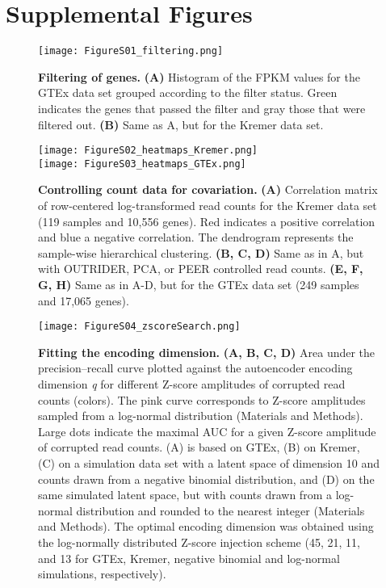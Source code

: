\documentclass[a4paper,12pt]{article}
\begin{document}
\section{Supplemental Figures}


\begin{figure}[h]
    \centering
    \texttt{[image: FigureS01\_filtering.png]}
    \caption{\textbf{Filtering of genes.}
\textbf{(A)} Histogram of the FPKM values for the GTEx data set grouped according to the filter status. Green indicates the genes that passed the filter and gray those that were filtered out. \textbf{(B)} Same as A, but for the Kremer data set.}
\end{figure}
\pagebreak


\begin{figure}[h]
    \centering
    \texttt{[image: FigureS02\_heatmaps\_Kremer.png]}
    \\
    \texttt{[image: FigureS03\_heatmaps\_GTEx.png]}
    \caption{\textbf{Controlling count data for covariation.}
\textbf{(A)} Correlation matrix of row-centered log-transformed read counts for the Kremer data set (119 samples and 10,556 genes). Red indicates a positive correlation and blue a negative correlation. The dendrogram represents the sample-wise hierarchical clustering. \textbf{(B, C, D)} Same as in A, but with OUTRIDER, PCA, or PEER controlled read counts. \textbf{(E, F, G, H)} Same as in A-D, but for the GTEx data set (249 samples and 17,065 genes).}
\end{figure}
\pagebreak


\begin{figure}[h]
    \centering
    \texttt{[image: FigureS04\_zscoreSearch.png]}
    \caption{\textbf{Fitting the encoding dimension.} 
\textbf{(A, B, C, D)} Area under the precision--recall curve plotted against the autoencoder encoding dimension \textit{q} for different Z-score amplitudes of corrupted read counts (colors). The pink curve corresponds to Z-score amplitudes sampled from a log-normal distribution (Materials and Methods). Large dots indicate the maximal AUC for a given Z-score amplitude of corrupted read counts. (A) is based on GTEx, (B) on Kremer, (C) on a simulation data set with a latent space of dimension 10 and counts drawn from a negative binomial distribution, and (D) on the same simulated latent space, but with counts drawn from a log-normal distribution and rounded to the nearest integer (Materials and Methods). The optimal encoding dimension was obtained using the log-normally distributed Z-score injection scheme (45, 21, 11, and 13 for GTEx, Kremer, negative binomial and log-normal simulations, respectively).}
\end{figure}
\pagebreak
\end{document}
